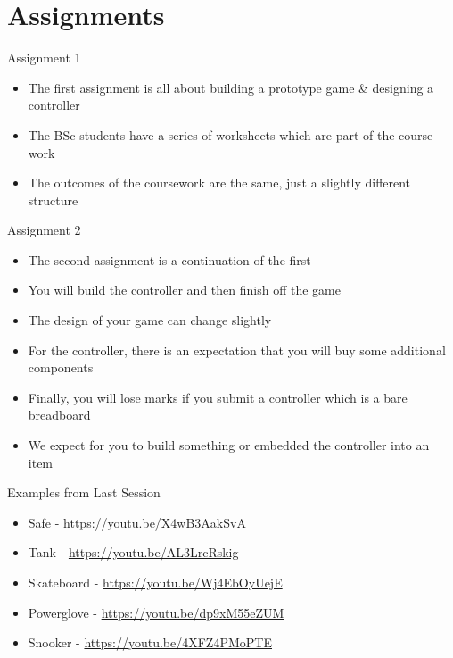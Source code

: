 \part{Assignments}
\frame{\partpage}

\begin{frame}{Assignment 1}
\begin{itemize}
	\pause \item The first assignment is all about building a prototype game \& designing a controller
	\pause \item The BSc students have a series of worksheets which are part of the course work
	\pause \item The outcomes of the coursework are the same, just a slightly different structure
\end{itemize}
\end{frame}


\begin{frame}{Assignment 2}
\begin{itemize}
	\pause \item The second assignment is a continuation of the first
	\pause \item You will build the controller and then finish off the game
	\pause \item The design of your game can change slightly
	\pause \item For the controller, there is an expectation that you will buy some additional components
	\pause \item Finally, you will lose marks if you submit a controller which is a bare breadboard
	\pause \item We expect for you to build something or embedded the controller into an item
\end{itemize}
\end{frame}

\begin{frame}{Examples from Last Session}
\begin{itemize}
	\item Safe - \url{https://youtu.be/X4wB3AakSvA}
	\item Tank - \url{https://youtu.be/AL3LrcRskig}
	\item Skateboard - \url{https://youtu.be/Wj4EbOyUejE}
	\item Powerglove - \url{https://youtu.be/dp9xM55eZUM}
	\item Snooker -  \url{https://youtu.be/4XFZ4PMoPTE}
\end{itemize}
\end{frame}

